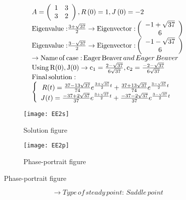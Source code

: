 \documentclass[a4paper]{article}
\begin{document}
\[\begin{array}{l}
A = \left( {\begin{array}{*{20}{c}}
1&3\\
3&2
\end{array}} \right),R\left( 0 \right) = 1,J\left( 0 \right) =  - 2\\
{\rm{Eigenvalue:}}\frac{{{\rm{3 + }}\sqrt {37} }}{2} \to {\rm{Eigenvector:}}\left( {\begin{array}{*{20}{c}}
{ - 1 + \sqrt {37} }\\
6
\end{array}} \right)\\
{\rm{Eigenvalue:}}\frac{{{\rm{3 - }}\sqrt {37} }}{2} \to {\rm{Eigenvector:}}\left( {\begin{array}{*{20}{c}}
{ - 1 - \sqrt {37} }\\
6
\end{array}} \right)\\
 \to {\rm{Name}}\,{\rm{of}}\,{\rm{case:}}\,{\rm{Eager}}\,{\rm{Beaver}}\,and\,Eager\,Beaver\\
{\rm{Using}}\,{\rm{R(0), J(0)}} \to {{\rm{c}}_1} = \frac{{2 - \sqrt {37} }}{{6\sqrt {37} }},{\rm{ }}{{\rm{c}}_2} = \frac{{ - 2 - \sqrt {37} }}{{6\sqrt {37} }}\\
{\rm{Final}}\,{\rm{solution:}}\\
\left\{ {\begin{array}{*{20}{c}}
{R(t) = \frac{{37 - 13\sqrt {37} }}{{74}}{e^{\frac{{3 + \sqrt {37} }}{2}t}} + \frac{{37 + 13\sqrt {37} }}{{74}}{e^{\frac{{3 - \sqrt {37} }}{2}t}}}\\
{J(t) = \frac{{ - 37 + 2\sqrt {37} }}{{37}}{e^{\frac{{3 + \sqrt {37} }}{2}t}} + \frac{{ - 37 - 2\sqrt {37} }}{{37}}{e^{\frac{{3 - \sqrt {37} }}{2}t}}}
\end{array}} \right.
\end{array}\]
\begin{figure}[H]
\centering
\begin{subfigure}{.5\textwidth}
  \centering
  \texttt{[image: EE2s]}
  \caption*{Solution figure}
\end{subfigure}%
\begin{subfigure}{.5\textwidth}
  \centering
  \texttt{[image: EE2p]}
  \caption*{Phase-portrait figure}
\end{subfigure}
\end{figure}
\[  \to  Type\,of\,steady\,point:\,Saddle\,point\]
\end{document}
